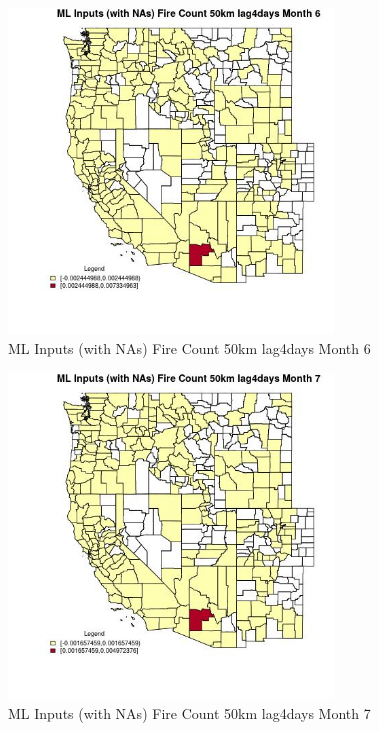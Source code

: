 \begin{figure} 
\centering  
\includegraphics[width=0.77\textwidth]{Code_Outputs/Report_ML_input_PM25_Step4_part_e_de_duplicated_aves_compiled_2019-05-20wNAs_CountyFire_Count_50km_lag4daysmedianMonth6.jpg} 
\caption{\label{fig:Report_ML_input_PM25_Step4_part_e_de_duplicated_aves_compiled_2019-05-20wNAsCountyFire_Count_50km_lag4daysmedianMonth6}ML Inputs (with NAs) Fire Count 50km lag4days Month 6} 
\end{figure} 
 

\clearpage 

\begin{figure} 
\centering  
\includegraphics[width=0.77\textwidth]{Code_Outputs/Report_ML_input_PM25_Step4_part_e_de_duplicated_aves_compiled_2019-05-20wNAs_CountyFire_Count_50km_lag4daysmedianMonth7.jpg} 
\caption{\label{fig:Report_ML_input_PM25_Step4_part_e_de_duplicated_aves_compiled_2019-05-20wNAsCountyFire_Count_50km_lag4daysmedianMonth7}ML Inputs (with NAs) Fire Count 50km lag4days Month 7} 
\end{figure} 
 

